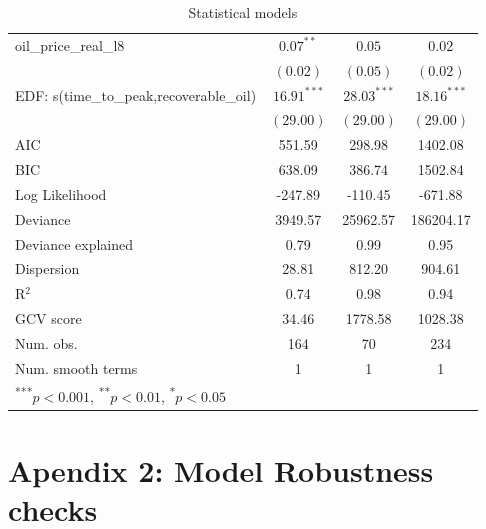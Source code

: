 \documentclass[12pt]{article}
\begin{document}
\begin{table}
\begin{center}
\begin{tabular}{l c c c }
oil_price_real_l8                    & $0.07^{**}$   & $0.05$        & $0.02$        \\
                                     & $(0.02)$      & $(0.05)$      & $(0.02)$      \\
EDF: s(time_to_peak,recoverable_oil) & $16.91^{***}$ & $28.03^{***}$ & $18.16^{***}$ \\
                                     & $(29.00)$     & $(29.00)$     & $(29.00)$     \\
\hline
AIC                                  & 551.59        & 298.98        & 1402.08       \\
BIC                                  & 638.09        & 386.74        & 1502.84       \\
Log Likelihood                       & -247.89       & -110.45       & -671.88       \\
Deviance                             & 3949.57       & 25962.57      & 186204.17     \\
Deviance explained                   & 0.79          & 0.99          & 0.95          \\
Dispersion                           & 28.81         & 812.20        & 904.61        \\
R$^2$                                & 0.74          & 0.98          & 0.94          \\
GCV score                            & 34.46         & 1778.58       & 1028.38       \\
Num. obs.                            & 164           & 70            & 234           \\
Num. smooth terms                    & 1             & 1             & 1             \\
\hline
\multicolumn{4}{l}{\scriptsize{\textsuperscript{***}$p<0.001$, 
  \textsuperscript{**}$p<0.01$, 
  \textsuperscript{*}$p<0.05$}}
\end{tabular}
\caption{Statistical models}
\label{table:prepeak}
\end{center}
\end{table}


 \section{Apendix 2: Model Robustness checks}



\end{document}
